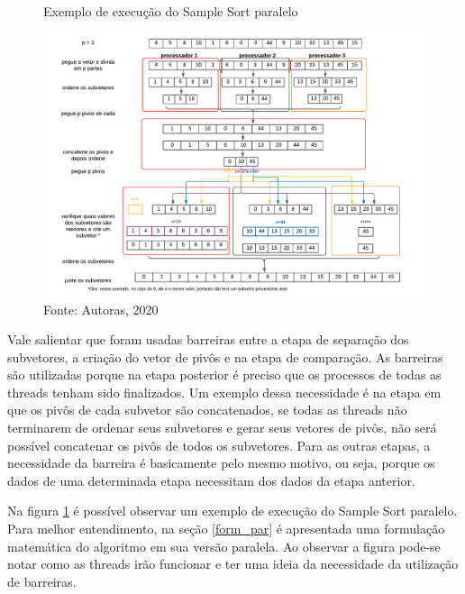 \documentclass[journal]{IEEEtran}
\begin{document}
\begin{figure}[!htbp]
    \centering
    \caption{Exemplo de execução do Sample Sort paralelo}
    \includegraphics[width=6in]{imagens/samplesortparalelo.pdf}
     \caption*{Fonte: Autoras, 2020}
    \label{fig:paralelo}
\end{figure}

Vale salientar que foram usadas barreiras entre a etapa de separação dos subvetores, a criação do vetor de pivôs e na etapa de comparação. As barreiras são utilizadas porque na etapa posterior é preciso que os processos de todas as threads tenham sido finalizados. Um exemplo dessa necessidade é na etapa em que os pivôs de cada subvetor são concatenados, se todas as threads não terminarem de ordenar seus subvetores e gerar seus vetores de pivôs, não será possível concatenar os pivôs de todos os subvetores. Para as outras etapas, a necessidade da barreira é basicamente pelo mesmo motivo, ou seja, porque os dados de uma determinada etapa necessitam dos dados da etapa anterior.

 Na figura \ref{fig:paralelo} é possível observar um exemplo de execução do Sample Sort paralelo. Para melhor entendimento, na seção \ref{form_par} é apresentada uma formulação matemática do algoritmo em sua versão paralela. Ao observar a figura pode-se notar como as threads irão funcionar e ter uma ideia da necessidade da utilização de barreiras.
\end{document}
